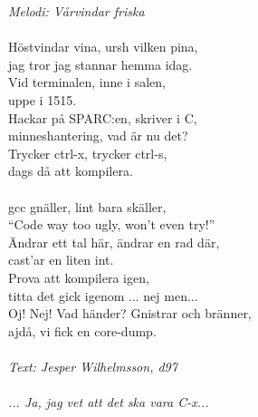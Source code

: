 {\footnotesize\textit{Melodi: Vårvindar friska}}\\
\\
Höstvindar vina, ursh vilken pina,\\
jag tror jag stannar hemma idag.\\
Vid terminalen, inne i salen,\\
uppe i 1515.\\
Hackar på SPARC:en, skriver i C,\\
minneshantering, vad är nu det?\\
Trycker ctrl-x, trycker ctrl-s,\\
dags då att kompilera.\\
\\
gcc gnäller, lint bara skäller,\\
“Code way too ugly, won’t even try!”\\
Ändrar ett tal här, ändrar en rad där,\\
cast’ar en liten int.\\
Prova att kompilera igen,\\
titta det gick igenom ... nej men...\\
Oj! Nej! Vad händer? Gnistrar och bränner,\\
ajdå, vi fick en core-dump.\\
\\
{\footnotesize\textit{Text: Jesper Wilhelmsson, d97\\
    \\
    ... Ja, jag vet att det ska vara C-x...}}
